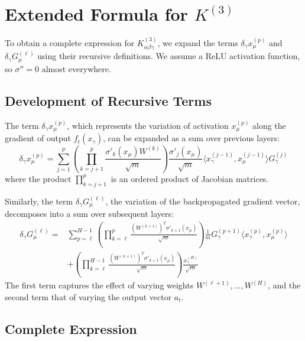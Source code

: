 \documentclass[11pt,a4paper]{article}
\theoremstyle{definition}
\begin{document}
\section{Extended Formula for $K^{(3)}$}

To obtain a complete expression for $K^{(3)}_{\alpha\beta\gamma}$, we expand the terms $\delta_\gamma x^{(p)}_\mu$ and $\delta_\gamma G^{(\ell)}_\mu$ using their recursive definitions. We assume a ReLU activation function, so $\sigma''=0$ almost everywhere.

\subsection{Development of Recursive Terms}

The term $\delta_\gamma x^{(p)}_\mu$, which represents the variation of activation $x^{(p)}_\mu$ along the gradient of output $f_t(x_\gamma)$, can be expanded as a sum over previous layers:
\begin{equation}
\delta_\gamma x^{(p)}_\mu = \sum_{j=1}^{p} \left( \prod_{k=j+1}^{p} \frac{\sigma'_{k}(x_\mu) W^{(k)}}{\sqrt{m}} \right) \frac{\sigma'_{j}(x_\mu)}{\sqrt{m}} \langle x^{(j-1)}_\gamma, x^{(j-1)}_\mu \rangle G^{(j)}_\gamma
\end{equation}
where the product $\prod_{k=j+1}^{p}$ is an ordered product of Jacobian matrices.

Similarly, the term $\delta_\gamma G^{(\ell)}_\mu$, the variation of the backpropagated gradient vector, decomposes into a sum over subsequent layers:
\begin{align}
\delta_\gamma G^{(\ell)}_\mu = & \sum_{p=\ell}^{H-1} \left( \prod_{k=\ell}^{p} \frac{(W^{(k+1)})^T \sigma'_{k+1}(x_\mu)}{\sqrt{m}} \right) \frac{1}{m} G^{(p+1)}_\gamma \langle x^{(p)}_\gamma, x^{(p)}_\mu \rangle \\
& + \left( \prod_{k=\ell}^{H-1} \frac{(W^{(k+1)})^T \sigma'_{k+1}(x_\mu)}{\sqrt{m}} \right) \frac{x^{(H)}_\gamma}{\sqrt{m}}
\end{align}
The first term captures the effect of varying weights $W^{(\ell+1)}, \dots, W^{(H)}$, and the second term that of varying the output vector $a_t$.

\subsection{Complete Expression}
\end{document}
